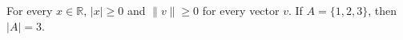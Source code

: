For every $x \in \mathbb{R}$, $\lvert x \rvert \geq 0$ and $\lVert v \rVert \geq 0$ for every vector $v$.
If $A = \{1, 2, 3\}$, then $\lvert A \rvert = 3$.